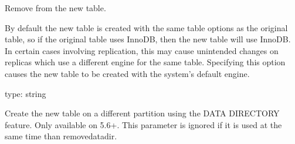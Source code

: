 \documentclass[letterpaper,10pt,english]{sphinxmanual}
\begin{document}

\begin{fulllineitems}
\label{\detokenize{mariadb-schema-change:cmdoption-mariadb-schema-change-default-engine}}
Remove  from the new table.

By default the new table is created with the same table options as
the original table, so if the original table uses InnoDB, then the new
table will use InnoDB.  In certain cases involving replication, this may
cause unintended changes on replicas which use a different engine for
the same table.  Specifying this option causes the new table to be
created with the system’s default engine.

\end{fulllineitems}


\begin{fulllineitems}
\label{\detokenize{mariadb-schema-change:cmdoption-mariadb-schema-change-data-dir}}
type: string

Create the new table on a different partition using the DATA DIRECTORY feature.
Only available on 5.6+. This parameter is ignored if it is used at the same time
than remove\sphinxhyphen{}data\sphinxhyphen{}dir.

\end{fulllineitems}
\end{document}
